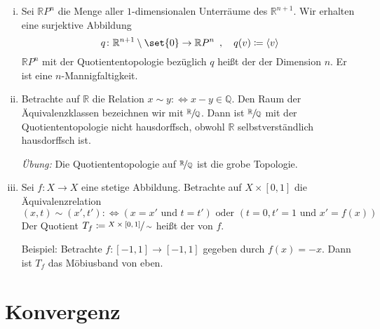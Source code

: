 \begin{beispiel}[{name=[Räume konstruiert als Quotienten]}]
\begin{enumerate}[(i)]
\begin{figure}[hbt]
			\caption[Möbius-Band]{Möbius-Band, }\label{fig:moebius}
		\end{figure}
		\item Sei $\mathbb{R}P^n$ die Menge aller $1$-dimensionalen Unterräume des $\mathbb{R}^{n+1}$.
		Wir erhalten eine surjektive Abbildung
		\[
			q \colon \mathbb{R}^{n+1}\setminus \set{0} \to \mathbb{R}P^n \enspace,  \quad  q(v) \coloneqq \langle v\rangle
		\]
		$\mathbb{R}P^n$ mit der Quotiententopologie bezüglich $q$ heißt der  der Dimension $n$. Er ist eine $n$-Mannigfaltigkeit.
		\item Betrachte auf $\mathbb{R}$ die Relation $x \sim y :\Leftrightarrow x-y \in \mathbb{Q}$.
		Den Raum der Äquivalenzklassen bezeichnen wir mit $\sfrac{\mathbb{R}}{\mathbb{Q}}$.
		Dann ist $\sfrac{\mathbb{R}}{\mathbb{Q}}$ mit der Quotiententopologie nicht hausdorffsch, obwohl $\mathbb{R}$ selbstverständlich hausdorffsch ist.

		\emph{Übung:} Die Quotiententopologie auf $\nicefrac{\mathbb{R}}{\mathbb{Q}}$ ist die grobe Topologie.
		\item\label{210:enum:5} Sei $f \colon X \to X$ eine stetige Abbildung.
		Betrachte auf $X \times [0,1]$ die Äquivalenzrelation
		\[
			(x,t) \sim (x',t') : \Longleftrightarrow (x=x' \text{ und } t=t') \text{ oder } (t=0, t'=1 \text{ und } x'= f(x))
		\]
		Der Quotient $T_f \coloneqq \sfrac{X \times [0,1]}{\sim}$ heißt der  von $f$.

		Beispiel: Betrachte $f \colon [{-1,1}] \to [{-1,1}]$ gegeben durch $f(x)=-x$.
		Dann ist $T_f$ das Möbiusband von eben.
	\end{enumerate}
\end{beispiel}

\newpage

\section{Konvergenz} %
\label{sec:konvergenz}

